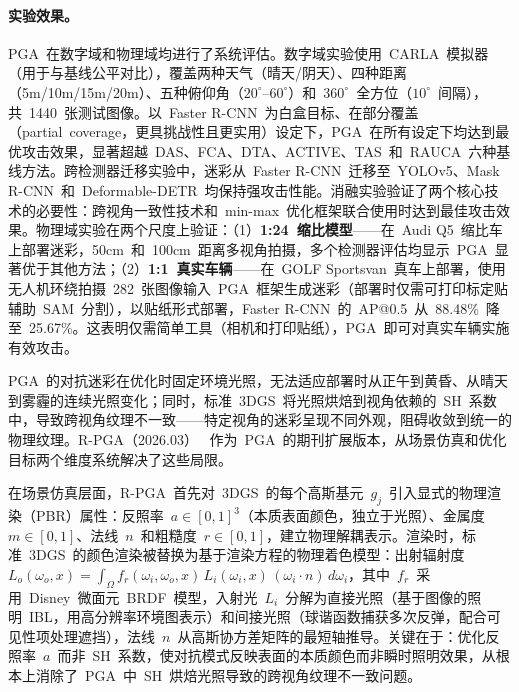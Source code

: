 \paragraph{实验效果。}
PGA~在数字域和物理域均进行了系统评估。数字域实验使用~CARLA~模拟器（用于与基线公平对比），覆盖两种天气（晴天/阴天）、四种距离（5m/10m/15m/20m）、五种俯仰角（$20^\circ$--$60^\circ$）和~$360^\circ$~全方位（$10^\circ$~间隔），共~1440~张测试图像。以~Faster R-CNN~为白盒目标、在部分覆盖（partial~coverage，更具挑战性且更实用）设定下，PGA~在所有设定下均达到最优攻击效果，显著超越~DAS、FCA、DTA、ACTIVE、TAS~和~RAUCA~六种基线方法。跨检测器迁移实验中，迷彩从~Faster R-CNN~迁移至~YOLOv5、Mask R-CNN~和~Deformable-DETR~均保持强攻击性能。消融实验验证了两个核心技术的必要性：跨视角一致性技术和~min-max~优化框架联合使用时达到最佳攻击效果。物理域实验在两个尺度上验证：（1）\textbf{1:24~缩比模型}——在~Audi Q5~缩比车上部署迷彩，50cm~和~100cm~距离多视角拍摄，多个检测器评估均显示~PGA~显著优于其他方法；（2）\textbf{1:1~真实车辆}——在~GOLF Sportsvan~真车上部署，使用无人机环绕拍摄~282~张图像输入~PGA~框架生成迷彩（部署时仅需可打印标定贴辅助~SAM~分割），以贴纸形式部署，Faster R-CNN~的~AP@0.5~从~88.48\%~降至~25.67\%。这表明仅需简单工具（相机和打印贴纸），PGA~即可对真实车辆实施有效攻击。

PGA~的对抗迷彩在优化时固定环境光照，无法适应部署时从正午到黄昏、从晴天到雾霾的连续光照变化；同时，标准~3DGS~将光照烘焙到视角依赖的~SH~系数中，导致跨视角纹理不一致——特定视角的迷彩呈现不同外观，阻碍收敛到统一的物理纹理。R-PGA（2026.03）~\cite{2603_26067} 作为~PGA~的期刊扩展版本，从场景仿真和优化目标两个维度系统解决了这些局限。

在场景仿真层面，R-PGA~首先对~3DGS~的每个高斯基元~$g_j$~引入显式的物理渲染（PBR）属性：反照率~$a \in [0,1]^3$（本质表面颜色，独立于光照）、金属度~$m \in [0,1]$、法线~$n$~和粗糙度~$r \in [0,1]$，建立物理解耦表示。渲染时，标准~3DGS~的颜色渲染被替换为基于渲染方程的物理着色模型：出射辐射度~$L_o(\omega_o, x) = \int_\Omega f_r(\omega_i, \omega_o, x)\, L_i(\omega_i, x)\, (\omega_i \cdot n)\, d\omega_i$，其中~$f_r$~采用~Disney~微面元~BRDF~模型，入射光~$L_i$~分解为直接光照（基于图像的照明~IBL，用高分辨率环境图表示）和间接光照（球谐函数捕获多次反弹，配合可见性项处理遮挡），法线~$n$~从高斯协方差矩阵的最短轴推导。关键在于：优化反照率~$a$~而非~SH~系数，使对抗模式反映表面的本质颜色而非瞬时照明效果，从根本上消除了~PGA~中~SH~烘焙光照导致的跨视角纹理不一致问题。

